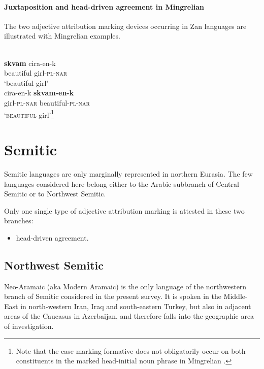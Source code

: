 \paragraph*{Juxtaposition and head\hyp{}driven agreement in Mingrelian}
The two adjective attribution marking devices occurring in Zan languages are illustrated with Mingrelian examples.
\begin{exe}
\begin{xlist}
\\
\label{mingrelian juxt}
\gll	\textbf{skvam} cira-en-k\\
	beautiful girl-\textsc{pl}-\textsc{nar}\\
\glt	‘beautiful girl’%
\\
\label{mingrelian agr}
\gll	cira-en-k \textbf{skvam-en-k}\\
	girl-\textsc{pl}-\textsc{nar} beautiful-\textsc{pl}-\textsc{nar}\\
\glt	‘\textsc{beautiful} girl’\footnote{Note that the case marking formative does not obligatorily occur on both constituents in the marked head-initial noun phrase in Mingrelian \citep[363–364]{harris1991b}.}%
\end{xlist}
\end{exe}

\section{Semitic}
Semitic languages are only marginally represented in northern Eurasia. The few languages considered here belong either to the Arabic subbranch of Central Semitic or to Northwest Semitic.

Only one single type of adjective attribution marking is attested in these two branches:
\begin{itemize}
\item head\hyp{}driven agreement.
\end{itemize}

\subsection{Northwest Semitic}
Neo-Aramaic (aka Modern Aramaic) is the only language of the northwestern branch of Semitic considered in the present survey. It is spoken in the Middle-East in north-western Iran, Iraq and south-eastern Turkey, but also in adjacent areas of the Caucasus in Azerbaijan, and therefore falls into the geographic area of investigation.

